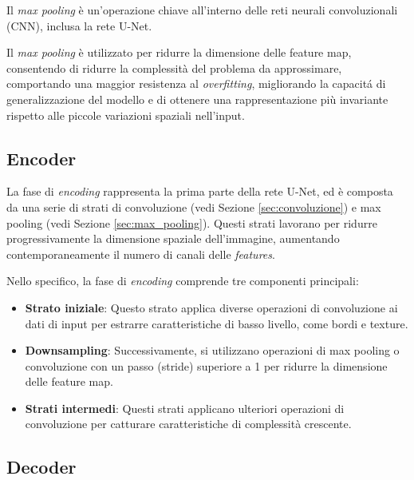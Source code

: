 Il \textit{max pooling} è un'operazione chiave all'interno delle reti neurali convoluzionali (CNN),
inclusa la rete U-Net.

Il \textit{max pooling} è utilizzato per ridurre la dimensione delle feature
map, consentendo di ridurre la complessità del problema da approssimare,
comportando una maggior resistenza al \textit{overfitting}, migliorando la
capacit\'a di generalizzazione del modello e di ottenere una rappresentazione
più invariante rispetto alle piccole variazioni spaziali nell'input.


\subsection{Encoder}
\label{sec:Encoder}

La fase di \textit{encoding} rappresenta la prima parte della rete U-Net, ed è composta da una serie
di strati di convoluzione (vedi Sezione \ref{sec:convoluzione}) e max pooling (vedi Sezione
\ref{sec:max_pooling}). Questi strati lavorano per ridurre progressivamente la dimensione spaziale
dell'immagine, aumentando contemporaneamente il numero di canali delle \textit{features}.

Nello specifico, la fase di \textit{encoding} comprende tre componenti principali:
\begin{itemize}
	\item \textbf{Strato iniziale}: Questo strato applica diverse operazioni di convoluzione ai dati
	      di input per estrarre caratteristiche di basso livello, come bordi e texture.
	\item \textbf{Downsampling}: Successivamente, si utilizzano operazioni di max pooling o
	      convoluzione con un passo (stride) superiore a 1 per ridurre la dimensione delle feature map.
	\item \textbf{Strati intermedi}: Questi strati applicano ulteriori operazioni di convoluzione per
	      catturare caratteristiche di complessità crescente.
\end{itemize}


\subsection{Decoder}
\label{sec:Decoder}

